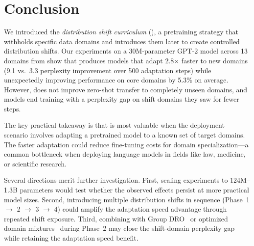 \section{Conclusion}
\label{sec:conclusion}

We introduced the \emph{distribution shift curriculum} (\dsc), a pretraining strategy that withholds specific data domains and introduces them later to create controlled distribution shifts. Our experiments on a 30M-parameter GPT-2 model across 13 domains from \thepile show that \dsc produces models that adapt 2.8$\times$ faster to new domains (9.1 vs.\ 3.3 perplexity improvement over 500 adaptation steps) while unexpectedly improving performance on core domains by 5.3\% on average. However, \dsc does not improve zero-shot transfer to completely unseen domains, and models end training with a perplexity gap on shift domains they saw for fewer steps.

The key practical takeaway is that \dsc is most valuable when the deployment scenario involves adapting a pretrained model to a known set of target domains. The faster adaptation could reduce fine-tuning costs for domain specialization---a common bottleneck when deploying language models in fields like law, medicine, or scientific research.

Several directions merit further investigation. First, scaling experiments to 124M--1.3B parameters would test whether the observed effects persist at more practical model sizes. Second, introducing multiple distribution shifts in sequence (Phase~1 $\to$ 2 $\to$ 3 $\to$ 4) could amplify the adaptation speed advantage through repeated shift exposure. Third, combining \dsc with Group DRO~\cite{sagawa2019dro} or optimized domain mixtures~\cite{xie2023doremi} during Phase~2 may close the shift-domain perplexity gap while retaining the adaptation speed benefit.

